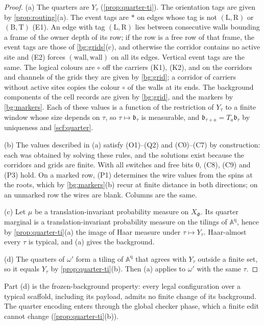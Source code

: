 \begin{proof}
(a) The quarters are $Y_\tau$ (\cref{prop:quarter-ti}). The orientation tags are given by \cref{prop:routing}(a). The event tags are $*$ on edges whose tag is not $(\mathrm L,\mathrm R)$ or $(\mathrm B,\mathrm T)$ (E1). An edge with tag $(\mathrm L,\mathrm R)$ lies between consecutive walls bounding a frame of the owner depth of its row; if the row is a free row of that frame, the event tags are those of \cref{bg:grids}(c), and otherwise the corridor contains no active site and (E2) forces $(\mathrm{wall},\mathrm{wall})$ on all its edges. Vertical event tags are the same. The logical colours are $\circ$ off the carriers (K1), (K2), and on the corridors and channels of the grids they are given by \cref{bg:grid}; a corridor of carriers without active sites copies the colour $\circ$ of the walls at its ends. The background components of the cell records are given by \cref{bg:grid}, and the markers by \cref{bg:markers}. Each of these values is a function of the restriction of $Y_\tau$ to a finite window whose size depends on $\tau$, so $\tau\mapsto\mathfrak b_\tau$ is measurable, and $\mathfrak b_{\tau+a}=T_a\mathfrak b_\tau$ by uniqueness and \cref{scf:quarter}.

(b) The values described in (a) satisfy (O1)--(Q2) and (C0)--(C7) by construction: each was obtained by solving these rules, and the solutions exist because the corridors and grids are finite. With all switches and free bits $0$, (C8), (C9) and (P3) hold. On a marked row, (P1) determines the wire values from the spins at the roots, which by \cref{bg:markers}(b) recur at finite distance in both directions; on an unmarked row the wires are blank. Columns are the same.

(c) Let $\mu$ be a translation-invariant probability measure on $X_\Phi$. Its quarter marginal is a translation-invariant probability measure on the tilings of $\mathbb A^{\mathrm q}$, hence by \cref{prop:quarter-ti}(a) the image of Haar measure under $\tau\mapsto Y_\tau$. Haar-almost every $\tau$ is typical, and (a) gives the background.

(d) The quarters of $\omega'$ form a tiling of $\mathbb A^{\mathrm q}$ that agrees with $Y_\tau$ outside a finite set, so it equals $Y_\tau$ by \cref{prop:quarter-ti}(b). Then (a) applies to $\omega'$ with the same $\tau$.
\end{proof}

Part (d) is the frozen-background property: every legal configuration over a typical scaffold, including its payload, admits no finite change of its background. The quarter encoding enters through the global checker phase, which a finite edit cannot change (\cref{prop:quarter-ti}(b)).

